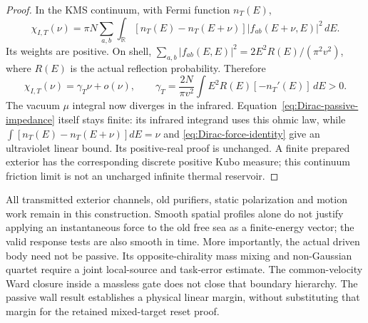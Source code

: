 \begin{proof}
In the KMS continuum, with Fermi function $n_T(E)$,
\begin{equation}
 \chi_{I,T}(\nu)=\pi N\sum_{a,b}\int_{\mathbb R}
 [n_T(E)-n_T(E+\nu)]|f_{ab}(E+\nu,E)|^2\,dE.             \label{eq:Dirac-KMS-force}
\end{equation}
Its weights are positive. On shell,
$\sum_{a,b}|f_{ab}(E,E)|^2=2E^2R(E)/(\pi^2v^2)$,
where $R(E)$ is the actual reflection probability. Therefore
\begin{equation}
 \chi_{I,T}(\nu)=\gamma_T\nu+o(\nu),\qquad
 \gamma_T=\frac{2N}{\pi v^2}\int E^2R(E)[-n_T'(E)]\,dE>0.
                                                               \label{eq:Dirac-thermal-friction}
\end{equation}
The vacuum $\mu$ integral now diverges in the infrared.
Equation~\eqref{eq:Dirac-passive-impedance} itself stays finite:
its infrared integrand uses this ohmic law, while
$\int[n_T(E)-n_T(E+\nu)]dE=\nu$ and
\eqref{eq:Dirac-force-identity} give an ultraviolet linear bound.
Its positive-real proof is unchanged. A finite prepared exterior has
the corresponding discrete positive Kubo measure; this continuum
friction limit is not an uncharged infinite thermal reservoir.
\end{proof}

All transmitted exterior channels, old purifiers, static polarization
and motion work remain in this construction. Smooth spatial profiles
alone do not justify applying an instantaneous force to the old free
sea as a finite-energy vector; the valid response tests are also smooth
in time. More importantly, the actual driven body need not be passive.
Its opposite-chirality mass mixing and non-Gaussian quartet require a
joint local-source and task-error estimate. The common-velocity Ward
closure inside a massless gate does not close that boundary hierarchy.
The passive wall result establishes a physical linear margin, without
substituting that margin for the retained mixed-target reset proof.

